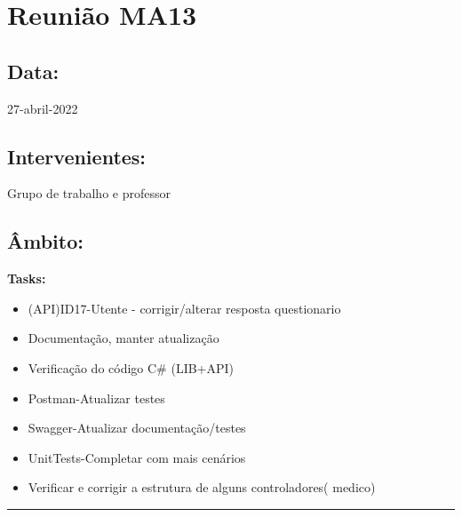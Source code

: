 \section{Reunião MA13}\label{reuniaoMA13}

\subsection*{Data:}
27-abril-2022

\subsection*{Intervenientes:}
Grupo de trabalho e professor

\subsection*{Âmbito:}

\textbf{Tasks:}

\begin{itemize}
	\item (API)ID17-Utente - corrigir/alterar resposta questionario
	\item Documentação, manter atualização
	\item Verificação do código C\# (LIB+API)
	\item Postman-Atualizar testes
	\item Swagger-Atualizar documentação/testes
	\item UnitTests-Completar com mais cenários
	\item Verificar e corrigir a estrutura de alguns controladores( medico)
	
\end{itemize}


\noindent \rule{\linewidth}{0.4pt}
\newline